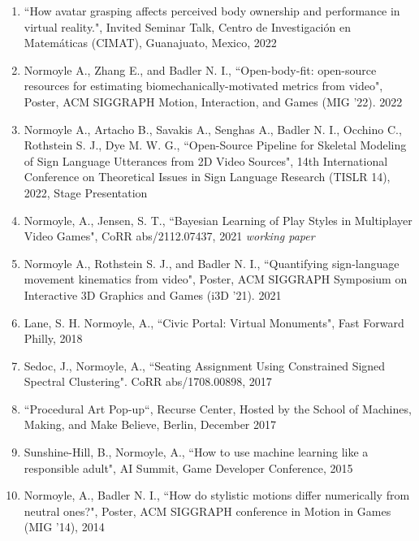 \begin{enumerate}[leftmargin=*]

\item ``How avatar grasping affects perceived body ownership and performance in virtual reality.", Invited Seminar Talk, Centro de Investigaci\'{o}n en Matem\'{a}ticas (CIMAT), Guanajuato, Mexico, 2022

\item Normoyle A., Zhang E., and Badler N. I., ``Open-body-fit: open-source resources for estimating biomechanically-motivated metrics from video", Poster, ACM SIGGRAPH Motion, Interaction, and Games (MIG '22). 2022

\item Normoyle A., Artacho B., Savakis A., Senghas A., Badler N. I., Occhino C., Rothstein S. J., Dye M. W. G., ``Open-Source Pipeline for Skeletal Modeling of Sign Language Utterances from 2D Video Sources", 14th International Conference on Theoretical Issues in Sign Language Research (TISLR 14), 2022, Stage Presentation

\item Normoyle, A., Jensen, S. T., ``Bayesian Learning of Play Styles in Multiplayer Video Games", CoRR abs/2112.07437, 2021 \emph{working paper}

\item Normoyle A., Rothstein S. J., and Badler N. I., ``Quantifying sign-language movement kinematics from video", Poster, ACM SIGGRAPH Symposium on Interactive 3D Graphics and Games (i3D '21). 2021

\item Lane, S. H. Normoyle, A., ``Civic Portal: Virtual Monuments", Fast Forward Philly, 2018

\item Sedoc, J., Normoyle, A., ``Seating Assignment Using Constrained Signed Spectral Clustering". CoRR abs/1708.00898, 2017 

\item ``Procedural Art Pop-up``, Recurse Center, Hosted by the School of Machines, Making, and Make Believe, Berlin, December 2017 

\item Sunshine-Hill, B., Normoyle, A., ``How to use machine learning like a responsible adult", AI Summit, Game Developer Conference, 2015

\item Normoyle, A., Badler N. I., ``How do stylistic motions differ numerically from neutral ones?", Poster, ACM SIGGRAPH conference in Motion in Games (MIG '14), 2014


\end{enumerate}
